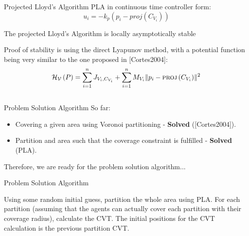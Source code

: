 \documentclass[t]{beamer}
\newcommand{\norm}[1]{\lVert #1 \rVert}
\begin{document}
\begin{frame}[label=projlloydsalgotheorem]{Projected Lloyd's Algorithm}
PLA in continuous time controller form:
\begin{equation} \label{ProjectedLloydsContol}
u_{i} = -k_{p}\left( p_i - \textit{proj}\left( C_{V_{i}} \right) \right)
\end{equation} 

\begin{theorem}
The projected Lloyd's Algorithm is locally asymptotically stable
\end{theorem}

Proof of stability is using the direct Lyapunov method, with a potential function being very similar to the one proposed in [Cortes2004]:
\begin{equation*}
\mathcal{H_{V}}\left( P \right) = \sum_{i=1}^{n} J_{V_i,C_{V_i}} + \sum_{i=1}^{n} M_{V_i} \norm{p_i - \textsc{proj}\left( C_{V_i}\right)}^2
\end{equation*}
\end{frame}

\subsection[Problem Solution Algorithm]{}
\begin{frame}[label=probsolalg1]{Problem Solution Algorithm}
So far:
\begin{itemize}
\item Covering a given area using Voronoi partitioning - \textbf{Solved} ([Cortes2004]).
\item Partition and area such that the coverage constraint is fulfilled - \textbf{Solved} (PLA).
\end{itemize}

Therefore, we are ready for the problem solution algorithm...
\end{frame}

\begin{frame}[label=probsolalg2]{Problem Solution Algorithm}
\begin{algorithm}[H]
\caption{Problem Solution Algorithm}\label{GeneralProbSolution}
\begin{algorithmic}[1]
\State Using some random initial guess, partition the whole area using PLA.
\State For each partition (assuming that the agents can actually cover each partition with their coverage radius), calculate the CVT. The initial positions for the CVT calculation is the previous partition CVT.
\end{algorithmic}
\end{algorithm}
\end{frame}
\end{document}
